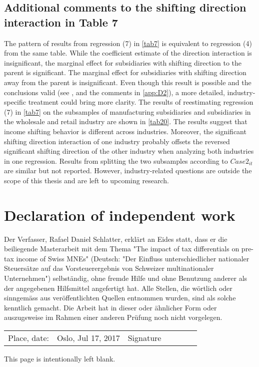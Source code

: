 \documentclass[10pt,twocolumn,oneside,cmyk]{article}
\begin{document}
\subsection{Additional comments to the shifting direction interaction in Table 7}\label{app:D3}

The pattern of results from regression (7) in \cref{tab7} is equivalent to regression (4) from the same table. While the coefficient estimate of the direction interaction is insignificant, the marginal effect for subsidiaries with shifting direction to the parent is significant. The marginal effect for subsidiaries with shifting direction away from the parent is insignificant. Even though this result is possible and the conclusions valid (see \textcite[70]{brambor_understanding_2006}, and the comments in \cref{app:D2}), a more detailed, industry-specific treatment could bring more clarity. The results of reestimating regression (7) in \cref{tab7}  on the subsamples of manufacturing subsidiaries and subsidiaries in the wholesale and retail industry are shown in \cref{tab20}. The results suggest that income shifting behavior is different across industries. Moreover, the significant shifting direction interaction of one industry probably offsets the reversed significant shifting direction of the other industry when analyzing both industries in one regression. Results from splitting the two subsamples according to $Case2_{it}$ are similar but not reported. However, industry-related questions are outside the scope of this thesis and are left to upcoming research.
\newpage

\onecolumn
\section*{Declaration of independent work}
Der Verfasser, Rafael Daniel Schlatter, erkl\"art an Eides statt, dass er die beiliegende Masterarbeit mit dem Thema "The impact of tax differentials on pre-tax income of Swiss MNEs" (Deutsch: "Der Einfluss unterschiedlicher nationaler Steuers\"atze auf das Vorsteuerergebnis von Schweizer multinationaler Unternehmen") selbst\"andig, ohne fremde Hilfe und ohne Benutzung anderer als der angegebenen Hilfsmittel angefertigt hat. Alle Stellen, die w\"ortlich oder sinngem\"ass aus ver\"offentlichten Quellen entnommen wurden, sind als solche kenntlich gemacht. Die Arbeit hat in dieser oder \"ahnlicher Form oder auszugsweise im Rahmen einer anderen Pr\"ufung noch nicht vorgelegen.
\vspace{2cm}

\begin{tabular}{l p{5cm}l p{4cm}l p{3cm}l}
Place, date: &Oslo, Jul 17, 2017 &Signature &
\\
\cmidrule{4-4}
\end{tabular}
\newpage

\thispagestyle{empty}
\vspace*{\fill}
\begin{center}
This page is intentionally left blank.
\end{center}
\clearpage

\twocolumn
\end{document}

